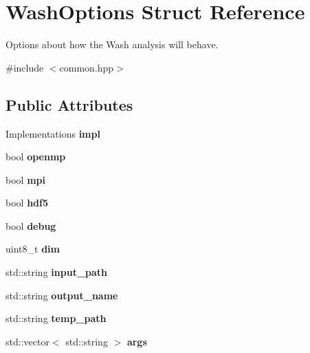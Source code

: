 \hypertarget{structWashOptions}{}\section{Wash\+Options Struct Reference}
\label{structWashOptions}


Options about how the Wash analysis will behave.  




{\ttfamily \#include $<$common.\+hpp$>$}

\subsection*{Public Attributes}
\begin{DoxyCompactItemize}
\item 
\mbox{\label{structWashOptions_a44a1b923dc5034a3bf45dee2f54623ca}} 
Implementations {\bfseries impl}
\item 
\mbox{\label{structWashOptions_a50d97883a6c0eaf8bafda97f5bad2a1e}} 
bool {\bfseries openmp}
\item 
\mbox{\label{structWashOptions_a9ec267278d89d04982e3d70e877d5c67}} 
bool {\bfseries mpi}
\item 
\mbox{\label{structWashOptions_a31ed802896363b97ac1f5199a6940df9}} 
bool {\bfseries hdf5}
\item 
\mbox{\label{structWashOptions_a5bc365ad8fc0544864d15709b6808843}} 
bool {\bfseries debug}
\item 
\mbox{\label{structWashOptions_a0caa33c545fc380c4104ca90f6462dfb}} 
uint8\+\_\+t {\bfseries dim}
\item 
\mbox{\label{structWashOptions_a4b43b8f0700908a6975a367d2cb9d567}} 
std\+::string {\bfseries input\+\_\+path}
\item 
\mbox{\label{structWashOptions_a091c31f0eee54c7b079268f7a1001547}} 
std\+::string {\bfseries output\+\_\+name}
\item 
\mbox{\label{structWashOptions_a27f59d7e66cdf80f0fe5cc5e699b0953}} 
std\+::string {\bfseries temp\+\_\+path}
\item 
\mbox{\label{structWashOptions_abc32ad74441fbc82069b4addc130d4cd}} 
std\+::vector$<$ std\+::string $>$ {\bfseries args}
\end{DoxyCompactItemize}


